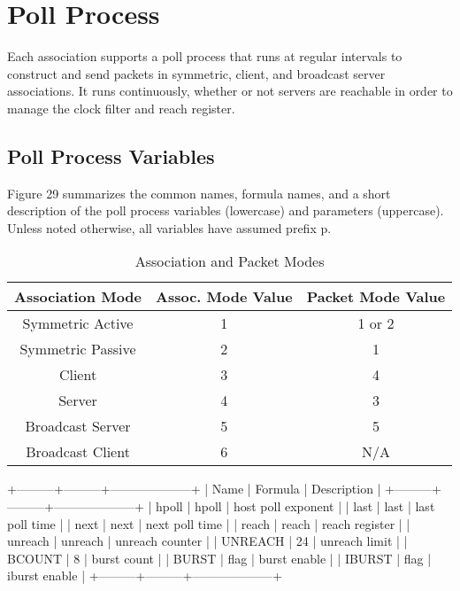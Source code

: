 \chapter{Poll Process}

Each association supports a poll process that runs at regular
intervals to construct and send packets in symmetric, client, and
broadcast server associations.  It runs continuously, whether or not
servers are reachable in order to manage the clock filter and reach
register.

\section{Poll Process Variables}

Figure 29 summarizes the common names, formula names, and a short
description of the poll process variables (lowercase) and parameters
(uppercase).  Unless noted otherwise, all variables have assumed
prefix p.

\begin{table}[htb]
\center
\begin{tabular}{c | c | c}
Association Mode & Assoc. Mode Value & Packet Mode Value \\
\hline
\hline
Symmetric Active & 1 & 1 or 2 \\
Symmetric Passive & 2 & 1 \\
Client & 3 & 4 \\
Server & 4 & 3 \\
Broadcast Server & 5 & 5 \\
Broadcast Client & 6 & N/A \\
\hline
\end{tabular}
\label{association_and_packet_modes}
\caption{Association and Packet Modes}
\end{table}

                +---------+---------+--------------------+
                | Name    | Formula | Description        |
                +---------+---------+--------------------+
                | hpoll   | hpoll   | host poll exponent |
                | last    | last    | last poll time     |
                | next    | next    | next poll time     |
                | reach   | reach   | reach register     |
                | unreach | unreach | unreach counter    |
                | UNREACH | 24      | unreach limit      |
                | BCOUNT  | 8       | burst count        |
                | BURST   | flag    | burst enable       |
                | IBURST  | flag    | iburst enable      |
                +---------+---------+--------------------+

